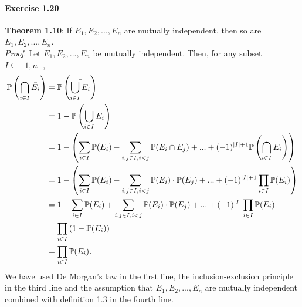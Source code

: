 \paragraph{Exercise 1.20} $~$ \\[0.2cm]
\textbf{Theorem 1.10}: If $E_1, E_2, ..., E_n$ are mutually independent, then so
are $\bar{E_1}, \bar{E_2}, ..., \bar{E_n}$. \\[0.2cm]
\textit{Proof}. Let $E_1, E_2, ..., E_n$ be mutually independent. Then, for any
subset $I \subseteq [1, n]$,
\begin{align*}
  \mathbb{P}\left(\bigcap_{i \in I} \bar{E_i}\right)
    &= \mathbb{P}\left(\bar{\bigcup_{i \in I} E_i}\right) \\
    &= 1 - \mathbb{P}\left(\bigcup_{i \in I} E_i\right) \\
    &= 1 - \left( \sum_{i \in I}\mathbb{P}(E_i) - \sum_{i,j \in I, i < j} \mathbb{P}(E_i \cap E_j) + ... + (-1)^{|I| + 1}\mathbb{P}\left(\bigcap_{i\in I}E_i\right) \right) \\
    &= 1 - \left( \sum_{i \in I} \mathbb{P}(E_i) - \sum_{i,j \in I, i < j} \mathbb{P}(E_i) \cdot \mathbb{P}(E_j) + ... + (-1)^{|I| + 1}\prod_{i\in I} \mathbb{P}(E_i) \right) \\
    &= 1 - \sum_{i \in I}\mathbb{P}(E_i) + \sum_{i,j \in I, i < j} \mathbb{P}(E_i) \cdot \mathbb{P}(E_j) + ... + (-1)^{|I|}\prod_{i\in I} \mathbb{P}(E_i) \\
    &= \prod_{i \in I}\left(1 - \mathbb{P}(E_i)\right) \\
    &= \prod_{i \in I}\mathbb{P}(\bar{E_i}).
\end{align*}
We have used De Morgan's law in the first line, the inclusion-exclusion principle
in the third line and the assumption that $E_1, E_2, ..., E_n$ are mutually
independent combined with definition 1.3 in the fourth line.
